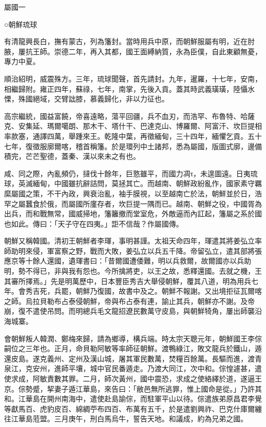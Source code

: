 
\begin{pinyinscope}
屬國一

○朝鮮琉球

有清龍興長白，撫有蒙古，列為籓封。當時用兵中原，而朝鮮服屬有明，近在肘腋，屢抗王師。崇德二年，再入其都，國王面縛納質，永為臣僕，自此東顧無憂，專力中夏。

順治紹明，威震殊方。三年，琉球聞聲，首先請封。九年，暹羅，十七年，安南，相繼歸附。雍正四年，蘇祿，七年，南掌，先後入貢。蓋其時武義璜璜，陸懾水慄，殊國絕域，交臂詘膝，慕義歸化，非以力征也。

高宗繼統，國益富饒，帝喜遠略，蕩平回疆，兵不血刃，而浩罕、布魯特、哈薩克、安集延、瑪爾噶朗、那木干、塔什干、巴達克山、博羅爾、阿富汗、坎巨提相率款塞，通譯四萬，舉踵來王。乾隆中葉，再徵緬甸，三十四年，緬懼乞貢。五十七年，復徵服廓爾喀，稽首稱籓。於是環列中土諸邦，悉為屬國，版圖式廓，邊備積完，芒芒聖德，蓋秦、漢以來未之有也。

咸、同之際，內亂頻仍，撻伐十餘年，巨憝雖平，而國力凋τ，未遑圖遠。日夷琉球，英滅緬甸，中國雖抗辭詰問，莫拯其亡。而越南、朝鮮政紛亂作，國家素守羈縻屬國之策，不干內政，興衰治亂，袖手膜視，以至越南亡於法，朝鮮並於日，浩罕之屬蠶食於俄，而屬國所廑存者，坎巨提一隅而已。越南、朝鮮之役，中國胥為出兵，而和戰無常，國威掃地，籓籬撤而堂室危，外敵逼而內訌起，籓屬之系於國也如此。傳曰：「天子守在四夷。」詎不信哉？作屬國傳。

朝鮮又稱韓國。清初王朝鮮者李琿，事明甚謹。太祖天命四年，琿遣其將姜弘立率師助明來侵，軍富察之野，戰而大敗，姜弘立以兵五千降。帝留弘立，遣其部將張應京等十餘人還國，遺琿書曰：「昔爾國遭倭難，明以兵救爾，故爾國亦以兵助明，勢不得已，非與我有怨也。今所擒將吏，以王之故，悉釋還國。去就之機，王其審所擇焉。」先是明萬歷中，日本豐臣秀吉大舉侵朝鮮，覆其八道，明為用兵七年。會秀吉死，兵罷，朝鮮乃復國，故書中及之。朝鮮不報謝。又出境拒征瓦爾喀之師。烏拉貝勒布占泰侵朝鮮，帝與布占泰有連，諭止其兵，朝鮮亦不謝。及帝崩，復不遣使吊問。而明總兵毛文龍招遼民數萬守皮島，與朝鮮犄角，屢出師襲沿海城寨。

會朝鮮叛人韓潤、鄭梅來歸，請為鄉導，構兵端。時太宗天聰元年，朝鮮國王李倧嗣位之三年也。正月，命貝勒阿敏等率師征朝鮮。渡鴨綠江，敗文龍兵於鐵山，遁還皮島。遂克義州、定州及漢山城，屠其軍民數萬，焚糧百餘萬。長驅而進，渡青泉江，克安州，進師平壤，城中官民番遁走。乃渡大同江，次中和。倧惶遽甚，遣使求成，阿敏責數其罪。二月，師次黃州，國中震恐，求成之使絡繹於道，遂逼王京。倧勢蹙，挈妻子遁江華島，來告曰：「敝邑無所逃罪，惟上國命是從。」乃許其和。江華島在開州南海中，遣使赴島諭倧，而駐軍平山以待。倧遣族弟原昌君李覺等獻馬百、虎豹皮百、綿綢苧布四百、布萬有五千，於是遣劉興祚、巴克什庫爾纏往江華島蒞盟。三月庚午，刑白馬烏牛，誓告天地。和議成，約為兄弟之國。


\end{pinyinscope}
